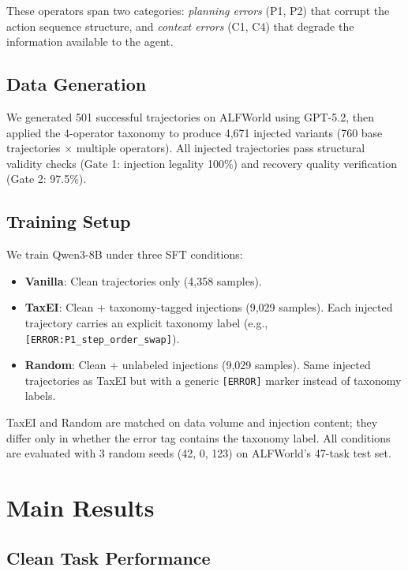 \documentclass[11pt,a4paper]{article}
\begin{document}
These operators span two categories: \emph{planning errors} (P1, P2) that corrupt the action sequence structure, and \emph{context errors} (C1, C4) that degrade the information available to the agent.

\subsection{Data Generation}

We generated 501 successful trajectories on ALFWorld using GPT-5.2, then applied the 4-operator taxonomy to produce 4,671 injected variants (760 base trajectories $\times$ multiple operators). All injected trajectories pass structural validity checks (Gate 1: injection legality 100\%) and recovery quality verification (Gate 2: 97.5\%).

\subsection{Training Setup}

We train Qwen3-8B under three SFT conditions:
\begin{itemize}
    \item \textbf{Vanilla}: Clean trajectories only (4,358 samples).
    \item \textbf{TaxEI}: Clean + taxonomy-tagged injections (9,029 samples). Each injected trajectory carries an explicit taxonomy label (e.g., \texttt{[ERROR:P1\_step\_order\_swap]}).
    \item \textbf{Random}: Clean + unlabeled injections (9,029 samples). Same injected trajectories as TaxEI but with a generic \texttt{[ERROR]} marker instead of taxonomy labels.
\end{itemize}

TaxEI and Random are matched on data volume and injection content; they differ only in whether the error tag contains the taxonomy label. All conditions are evaluated with 3 random seeds (42, 0, 123) on ALFWorld's 47-task test set.

\section{Main Results}
\label{sec:main}

\subsection{Clean Task Performance}
\end{document}
